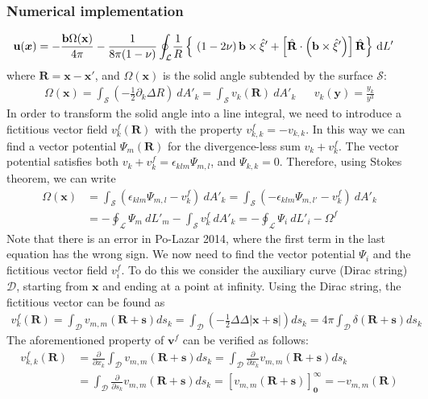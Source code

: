 \documentclass[10pt]{report}
\begin{document}
{\subsubsection{Numerical implementation}

\begin{align}
 \mathbf{u}(\bm x)=-\frac{\mathbf{ b}\Omega(\mathbf x)}{4\pi}-\frac{1}{8\pi(1-\nu)}\oint_\mathcal{L}&\frac{1}{R}\left\{\ 
 \left(1-2\nu\right) \mathbf{ b}\times\hat{\mathbf{ \xi}}'
+ \left[\hat{\mathbf{ R}}\cdot\left(\mathbf{ b}\times\hat{\mathbf{ \xi}}' \right) \right]\hat{\mathbf{ R}}  \right\}\dL'
\end{align}
where $\mathbf{R}=\mathbf x-\mathbf x'$, and  $\Omega(\mathbf x)$ is the solid angle subtended by the surface $\mathcal{S}$:
\begin{align}
\Omega(\mathbf{x})=\int_\mathcal{S}\left(-\frac{1}{2}\partial_k\Delta R\right)\ dA'_k=\int_\mathcal{S} v_k(\mathbf R)\ dA'_k&&v_k(\mathbf y)=\frac{y_k}{y^3}
\end{align}
In order to transform the solid angle into a line integral, we need to introduce a fictitious vector field $v_k^f(\mathbf R)$ with the property $v^f_{k,k}=-v_{k,k}$. In this way we can find a vector potential $\Psi_m(\mathbf{R})$ for the divergence-less sum $v_k+v^f_k$. The vector potential satisfies both $v_k+v^f_k=\epsilon_{klm}\Psi_{m,l}$, and $\Psi_{k,k}=0$. Therefore, using Stokes theorem, we can write
\begin{align}
\Omega(\mathbf{x})&=\int_\mathcal{S} \left(\epsilon_{klm}\Psi_{m,l}-v^f_k\right)\ dA'_k=\int_\mathcal{S} \left(-\epsilon_{klm}\Psi_{m,l'}-v^f_k\right)\ dA'_k\nonumber\\
&=-\oint_\mathcal{L}\Psi_m\ dL'_m-\int_\mathcal{S} v^f_k\ dA'_k=-\oint_\mathcal{L}\Psi_i\ dL'_i-\Omega^f
\end{align}
Note that there is an error in Po-Lazar 2014, where the first term in the last equation has the wrong sign.
We now need to find the vector potential $\Psi_i$ and the fictitious vector field $v_i^f$. To do this we consider the auxiliary curve (Dirac string) $\mathcal{D}$, starting from $\mathbf x$ and ending at a point at infinity. Using the Dirac string, the fictitious vector can be found as
\begin{align}
v^f_{k}(\mathbf{R})=\int_\mathcal{D}v_{m,m}(\mathbf{R}+\mathbf{s})ds_k
=\int_\mathcal{D}\left(-\frac{1}{2}\Delta\Delta |\mathbf{x}+\mathbf{s}|\right)ds_k
=4\pi\int_\mathcal{D}\delta(\mathbf{R}+\mathbf{s})ds_k
\end{align}
The aforementioned property of $\mathbf v^f$ can be verified as follows:
\begin{align}
v^f_{k,k}(\mathbf{R})
&=\frac{\partial}{\partial x_k}\int_\mathcal{D}v_{m,m}(\mathbf{R}+\mathbf{s})ds_k
=\int_\mathcal{D}\frac{\partial}{\partial x_k}v_{m,m}(\mathbf{R}+\mathbf{s})ds_k\nonumber\\
&=\int_\mathcal{D}\frac{\partial}{\partial s_k}v_{m,m}(\mathbf{R}+\mathbf{s})ds_k
=\left[v_{m,m}(\mathbf{R}+\mathbf{s})\right]_\mathbf{0}^\infty=-v_{m,m}(\mathbf{R})
\end{align}

}
\end{document}
